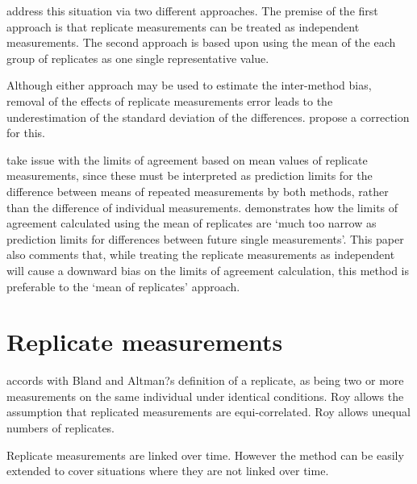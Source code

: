 \documentclass[12pt, a4paper]{report}
\theoremstyle{plain}
\theoremstyle{definition}
\theoremstyle{remark}
\begin{document}
	\citet*{BA86} address this situation via two different
	approaches. The premise of the first approach is that replicate
	measurements can be treated as independent measurements. The
	second approach is based upon using the mean of the each group of
	replicates as one single representative value. 
	
	
	Although either approach may be used to estimate the inter-method bias, removal of the effects of replicate
	measurements error leads to the underestimation of the
	standard deviation of the differences.
	\citet*{BA86} propose a correction for this.
	
	\citet{BXC2008} take issue with the limits of agreement based on
	mean values of replicate measurements, since these must be interpreted as prediction
	limits for the difference between means of repeated measurements by
	both methods, rather than the difference of individual measurements.
	\citet{BXC2008} demonstrates how the limits of agreement
	calculated using the mean of replicates are `much too narrow as
	prediction limits for differences between future single
	measurements'. This paper also comments that, while treating the
	replicate measurements as independent will cause a downward bias
	on the limits of agreement calculation, this method is preferable
	to the `mean of replicates' approach.
	
	

	
	\section{Replicate measurements}
	\citet{ARoy2009} accords with Bland and Altman?s definition of a replicate, as being two or more measurements on the same individual under identical conditions.
	Roy allows the assumption that replicated measurements are equi-correlated.
	Roy allows unequal numbers of replicates.
	
	Replicate measurements are linked over time. However the method can be easily extended to cover situations where they are not linked over time.
	
	
	
\end{document}
